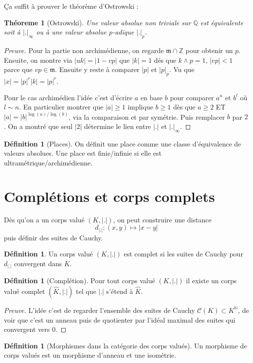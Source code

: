 \documentclass[a4paper,12pt]{book}
\newcommand{\Z}{\mathbb{Z}}
\newcommand{\Q}{\mathbb{Q}}
\newcommand{\N}{\mathbb{N}}
\theoremstyle{plain}
\newtheorem{thm}[subsection]{Théoreme}
\theoremstyle{definition}
\newtheorem{defn}[subsection]{Définition}
\theoremstyle{remark}
\begin{document}
Ça suffit à prouver le théorème d'Ostrowski :
\begin{thm}[Ostrowski] 
    Une valeur absolue non triviale sur $\Q$ est équivalente soit
    à $|.|_{\infty}$ ou à une valeur absolue $p$-adique $|.|_p$.
\end{thm}
\begin{proof}[Preuve]
    Pour la partie non archimédienne, on regarde $\mathfrak m\cap \Z$
    pour obtenir un $p$. Ensuite, on montre via $|uk|=|1-vp|$ que
    $|k|=1$ dés que $k\wedge p=1$, $|vp|<1$ parce que 
    $vp\in \mathfrak m$. Ensuite y reste à comparer $|p|$ et $|p|_{p}$.
    Vu que $|x|=|p|^r|k|=|p|^r$. 

    Pour le cas archimédien l'idée c'est d'écrire $a$ en base $b$ pour
    comparer $a^n$ et $b^l$ où $l\sim n$. En particulier montrer que
    $|a|\geq 1$ implique $b\geq1$ dès que $a\geq 2$ ET 
    $|a|=|b|^{\log(a)/\log(b)}$, via la comparaison et par symétrie.
    Puis remplacer $b$ par $2$. On a montré que seul $|2|$ détermine
    le lien entre $|.|$ et $|.|_{\infty}$.
\end{proof}
\begin{defn}[Places]
    On définit une place comme une classe d'équivalence de valeurs
    absolues. Une place est finie/infinie si elle est 
    ultramétrique/archimédienne.
\end{defn}

\section{Complétions et corps complets}
Dès qu'on a un corps valué $(K,|.|)$, on peut construire une distance
\[d_{|.|}\colon(x,y)\mapsto |x-y|\]
puis définir des suites de Cauchy. 
\begin{defn}
    Un corps valué $(K,|.|)$ est complet si les suites de Cauchy pour 
    $d_{|.|}$ convergent dans $K$.
\end{defn}
\begin{defn}[Complétion]
    Pour tout corps valué $(K,|.|)$ il existe un corps valué complet 
    $(\hat K,|.|)$ tel que $|.|$ s'étend à $\hat K$.
\end{defn}
\begin{proof}[Preuve]
    L'idée c'est de regarder l'ensemble des suites de Cauchy 
    $\mathscr C(K)\subset K^{\N}$, de voir que c'est un anneau 
    puis de quotienter par l'idéal maximal des suites qui convergent
    vers $0$.
\end{proof}

\begin{defn}[Morphismes dans la catégorie des corps valués]
    Un morphisme de corps valués est un morphisme d'anneau et une
    isométrie.
\end{defn}
\end{document}
